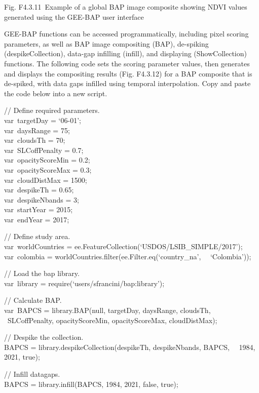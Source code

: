 \documentclass[
  letterpaper,
  DIV=11,
  numbers=noendperiod]{scrreprt}
\begin{document}
Fig. F4.3.11~Example of a global BAP image composite showing NDVI values
generated using the GEE-BAP user interface

GEE-BAP functions can be accessed programmatically, including pixel
scoring parameters, as well as BAP image compositing (BAP), de-spiking
(despikeCollection), data-gap infilling (infill), and displaying
(ShowCollection) functions. The following code sets the scoring
parameter values, then generates and displays the compositing results
(Fig. F4.3.12) for a BAP composite that is de-spiked, with data gaps
infilled using temporal interpolation. Copy and paste the code below
into a new script.

// Define required parameters.\\
var~targetDay = `06-01';\\
var~daysRange = 75;\\
var~cloudsTh = 70;\\
var~SLCoffPenalty = 0.7;\\
var~opacityScoreMin = 0.2;\\
var~opacityScoreMax = 0.3;\\
var~cloudDistMax = 1500;\\
var~despikeTh = 0.65;\\
var~despikeNbands = 3;\\
var~startYear = 2015;\\
var~endYear = 2017;

// Define study area.\\
var~worldCountries = ee.FeatureCollection(`USDOS/LSIB\_SIMPLE/2017');\\
var~colombia = worldCountries.filter(ee.Filter.eq(`country\_na',~
~`Colombia'));

// Load the bap library.\\
var~library = require(`users/sfrancini/bap:library');

// Calculate BAP.\\
var~BAPCS = library.BAP(null, targetDay, daysRange, cloudsTh,\\
\hspace*{0.333em} ~SLCoffPenalty, opacityScoreMin, opacityScoreMax,
cloudDistMax);

// Despike the collection.\\
BAPCS = library.despikeCollection(despikeTh, despikeNbands, BAPCS,~
~1984, 2021, true);

// Infill datagaps.\\
BAPCS = library.infill(BAPCS, 1984, 2021, false, true);
\end{document}
